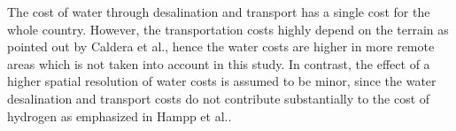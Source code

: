 The cost of water through desalination and transport has a single cost for the whole country. However, the transportation costs highly depend on the terrain as pointed out by Caldera et al.\cite{Caldera2016}, hence the water costs are higher in more remote areas which is not taken into account in this study. In contrast, the effect of a higher spatial resolution of water costs is assumed to be minor, since the water desalination and transport costs do not contribute substantially to the cost of hydrogen as emphasized in Hampp et al.\cite{Hampp2023}. %


